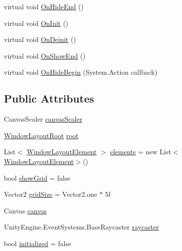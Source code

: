 \begin{DoxyCompactItemize}
virtual void \hyperlink{class_unity_engine_1_1_u_i_1_1_windows_1_1_window_layout_a0b8a015a1d56deed87e32d8f01dec2b6}{On\+Hide\+End} ()
\item 
virtual void \hyperlink{class_unity_engine_1_1_u_i_1_1_windows_1_1_window_layout_acbda7762601dfb70b5360e2744a70918}{On\+Init} ()
\item 
virtual void \hyperlink{class_unity_engine_1_1_u_i_1_1_windows_1_1_window_layout_a785bd1d79960daf9736fa3f7fc2c3ed3}{On\+Deinit} ()
\item 
virtual void \hyperlink{class_unity_engine_1_1_u_i_1_1_windows_1_1_window_layout_aca1c05d369a3276658fb3a2d2cb30f7f}{On\+Show\+End} ()
\item 
virtual void \hyperlink{class_unity_engine_1_1_u_i_1_1_windows_1_1_window_layout_a747192a16c06646bbf4d4b5a0d5dc930}{On\+Hide\+Begin} (System.\+Action callback)
\end{DoxyCompactItemize}
\subsection*{Public Attributes}
\begin{DoxyCompactItemize}
\item 
Canvas\+Scaler \hyperlink{class_unity_engine_1_1_u_i_1_1_windows_1_1_window_layout_adb8edfb4d837229b10faa4293c644ad8}{canvas\+Scaler}
\item 
\hyperlink{class_unity_engine_1_1_u_i_1_1_windows_1_1_window_layout_root}{Window\+Layout\+Root} \hyperlink{class_unity_engine_1_1_u_i_1_1_windows_1_1_window_layout_ac597e7eab6633cd6de35130204453d48}{root}
\item 
List$<$ \hyperlink{class_unity_engine_1_1_u_i_1_1_windows_1_1_window_layout_element}{Window\+Layout\+Element} $>$ \hyperlink{class_unity_engine_1_1_u_i_1_1_windows_1_1_window_layout_a6918fea3b497d45c24cdc650aa7a5887}{elements} = new List$<$\hyperlink{class_unity_engine_1_1_u_i_1_1_windows_1_1_window_layout_element}{Window\+Layout\+Element}$>$()
\item 
bool \hyperlink{class_unity_engine_1_1_u_i_1_1_windows_1_1_window_layout_a33e8f916ed337b6106080059b2ff3329}{show\+Grid} = false
\item 
Vector2 \hyperlink{class_unity_engine_1_1_u_i_1_1_windows_1_1_window_layout_a770d4579f84d0fe15d558e8bf0cf74d0}{grid\+Size} = Vector2.\+one $\ast$ 5f
\item 
Canvas \hyperlink{class_unity_engine_1_1_u_i_1_1_windows_1_1_window_layout_a4ba5e93e78ef5831b053fce698368774}{canvas}
\item 
Unity\+Engine.\+Event\+Systems.\+Base\+Raycaster \hyperlink{class_unity_engine_1_1_u_i_1_1_windows_1_1_window_layout_a054ac03b92e5d5181128ff1a258a98c5}{raycaster}
\item 
bool \hyperlink{class_unity_engine_1_1_u_i_1_1_windows_1_1_window_layout_a170e4ae580d5ea419e20dc0b6296179e}{initialized} = false
\end{DoxyCompactItemize}


